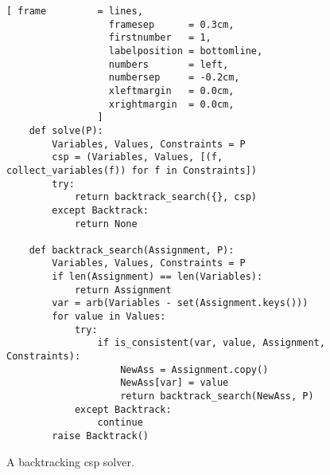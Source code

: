 \begin{figure}[!ht]
\centering
\begin{Verbatim}[ frame         = lines, 
                  framesep      = 0.3cm, 
                  firstnumber   = 1,
                  labelposition = bottomline,
                  numbers       = left,
                  numbersep     = -0.2cm,
                  xleftmargin   = 0.0cm,
                  xrightmargin  = 0.0cm,
                ]
    def solve(P):
        Variables, Values, Constraints = P
        csp = (Variables, Values, [(f, collect_variables(f)) for f in Constraints])
        try:
            return backtrack_search({}, csp)
        except Backtrack:
            return None
        
    def backtrack_search(Assignment, P):
        Variables, Values, Constraints = P
        if len(Assignment) == len(Variables):
            return Assignment
        var = arb(Variables - set(Assignment.keys()))
        for value in Values:
            try:
                if is_consistent(var, value, Assignment, Constraints):
                    NewAss = Assignment.copy()
                    NewAss[var] = value
                    return backtrack_search(NewAss, P)
            except Backtrack:
                continue
        raise Backtrack()  
\end{Verbatim}
\vspace*{-0.3cm}
\caption{A backtracking \ac{csp} solver.}
\label{fig:Backtrack-Solver.ipynb}
\end{figure}


